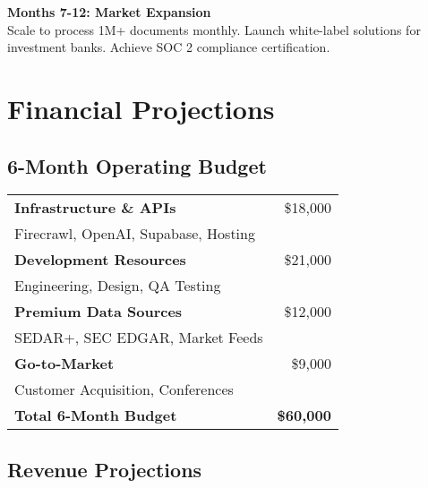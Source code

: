 \documentclass[11pt]{article}
\begin{document}
\textbf{Months 7-12: Market Expansion}\\
Scale to process 1M+ documents monthly. Launch white-label solutions for investment banks. Achieve SOC 2 compliance certification.

\section{Financial Projections}

\subsection{6-Month Operating Budget}

\begin{center}
\end{center}

\begin{metricbox}
\begin{tabularx}{\textwidth}{X r}
\textbf{Infrastructure \& APIs} & \$18,000 \\
\quad Firecrawl, OpenAI, Supabase, Hosting & \\[0.3em]
\textbf{Development Resources} & \$21,000 \\
\quad Engineering, Design, QA Testing & \\[0.3em]
\textbf{Premium Data Sources} & \$12,000 \\
\quad SEDAR+, SEC EDGAR, Market Feeds & \\[0.3em]
\textbf{Go-to-Market} & \$9,000 \\
\quad Customer Acquisition, Conferences & \\[0.3em]
\midrule
\textbf{Total 6-Month Budget} & \textbf{\$60,000} \\
\end{tabularx}
\end{metricbox}

\subsection{Revenue Projections}
\end{document}
